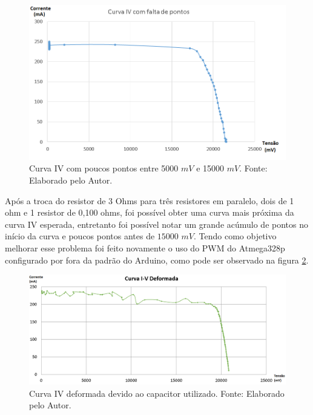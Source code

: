 \FloatBarrier
\begin{figure}[!htbp]
	\centering
	\includegraphics[scale=0.7]{imagens/CurvaIVpoucospontos}
	\caption{Curva IV com poucos pontos entre 5000 $mV$ e 15000 $mV$. Fonte: Elaborado pelo Autor. 	}
	\label{fig:Curvapoucos}
\end{figure}
\FloatBarrier

Após a troca do resistor de 3 Ohms para três resistores em paralelo, dois de 1 ohm e 1 resistor de 0,100 ohms, foi possível obter uma curva mais próxima da curva IV esperada, entretanto foi possível notar um grande acúmulo de pontos no início da curva e poucos pontos antes de $ 15000$ $mV$. Tendo como objetivo melhorar esse problema foi feito novamente o uso do PWM do Atmega328p configurado por fora da padrão do Arduino, como pode ser observado na figura \ref{fig:CurvaDeformada}.

\FloatBarrier
\begin{figure}[!htbp]
	\centering
	\includegraphics[scale=0.4]{imagens/CurvaIVdeformada}
	\caption{Curva IV deformada devido ao capacitor utilizado. Fonte: Elaborado pelo Autor. 	}
	\label{fig:CurvaDeformada}
\end{figure}
\FloatBarrier

